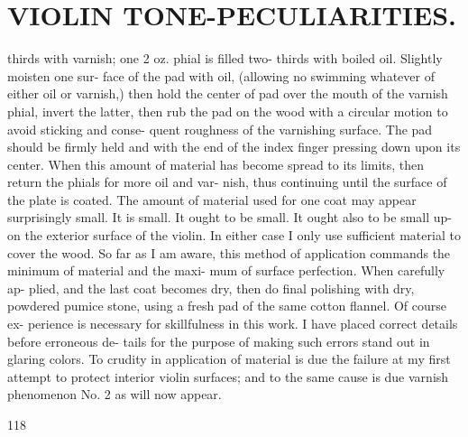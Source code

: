 \documentclass{article}
\begin{document}
\section*{VIOLIN TONE-PECULIARITIES.}
thirds with varnish; one 2 oz. phial is filled two- thirds with boiled oil. Slightly moisten one sur- face of the pad with oil, (allowing no swimming whatever of either oil or varnish,) then hold the center of pad over the mouth of the varnish phial, invert the latter, then rub the pad on the wood with a circular motion to avoid sticking and conse- quent roughness of the varnishing surface. The pad should be firmly held and with the end of the index finger pressing down upon its center. When this amount of material has become spread to its limits, then return the phials for more oil and var- nish, thus continuing until the surface of the plate is coated. The amount of material used for one coat may appear surprisingly small. It is small. It ought to be small. It ought also to be small up- on the exterior surface of the violin. In either case I only use sufficient material to cover the wood. So far as I am aware, this method of application commands the minimum of material and the maxi- mum of surface perfection. When carefully ap- plied, and the last coat becomes dry, then do final polishing with dry, powdered pumice stone, using a fresh pad of the same cotton flannel. Of course ex- perience is necessary for skillfulness in this work. I have placed correct details before erroneous de- tails for the purpose of making such errors stand out in glaring colors. To crudity in application of material is due the failure at my first attempt to protect interior violin surfaces; and to the same cause is due varnish phenomenon No. 2 as will now appear.

118
\end{document}
